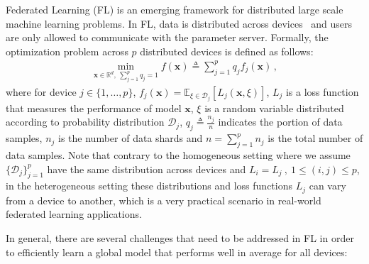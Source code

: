 \documentclass[sigconf, anonymous, review]{acmart}
\begin{document}
Federated Learning (FL) is an emerging framework for distributed large scale machine learning problems.
In FL, data is distributed across devices~\citep{konevcny2016federated,mcmahan2016communication} and users are only allowed to communicate with the parameter server.
Formally, the optimization problem across $p$ distributed devices is defined as follows:
\begin{align}\label{eq:main}
   \min_{\boldsymbol{x}\in \mathbb{R}^{d},\: \sum_{j=1}^pq_j=1} f(\boldsymbol{x})\triangleq \sum_{j=1}^{p}q_jf_j(\boldsymbol{x}) \, , 
\end{align}
where for device $j\in \{1,\ldots,p\}$, $f_j(\boldsymbol{x})=\mathbb{E}_{\xi\in\mathcal{D}_j}\left[L_j\left(\boldsymbol{x},\xi\right)\right]$, $L_j$ is a loss function that measures the performance of model $\boldsymbol{x}$, $\xi$ is a random variable distributed according to probability distribution $\mathcal{D}_j$, $q_j\triangleq\frac{n_j}{n}$ indicates the portion of data samples, $n_j$ is the number of data shards and $n=\sum_{j=1}^pn_j$ is the total number of data samples. 
Note that contrary to the homogeneous setting where we assume $\{\mathcal{D}_j\}_{j=1}^p$ have the same distribution across devices and $L_i=L_j \ , \ 1 \leq (i,j) \leq p$, in the heterogeneous setting these distributions and loss functions $L_j$ can vary from a device to another, which is a very practical scenario in real-world federated learning applications. 


In general, there are several challenges that need to be addressed in FL in order to efficiently learn a global model that performs well in average for all devices:
\end{document}
